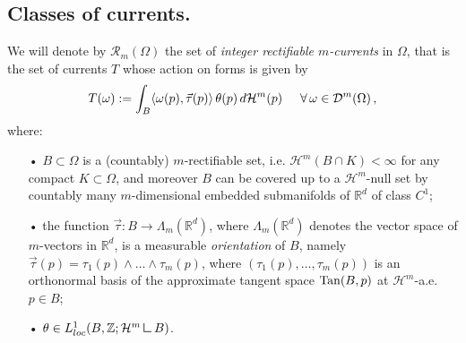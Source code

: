 \documentclass[a4paper,11pt,reqno]{amsart}
\theoremstyle{definition}
\numberwithin{equation}{section}
\numberwithin{subsection}{section}
\newcommand{\Z}{\mathbb{Z}}
\newcommand{\R}{\mathbb{R}}
\newcommand{\mres}{\mathbin{\vrule height 1.6ex depth 0pt width
0.13ex\vrule height 0.13ex depth 0pt width 1.3ex}}
\newcommand{\D}{\mathcal{D}}
\newcommand{\Rc}{\mathscr{R}}
\newcommand{\Ha}{\mathcal{H}}
\begin{document}
\subsection{Classes of currents.} We will denote by $\Rc_m(\Omega)$ the set of \emph{integer rectifiable $m$-currents} in $\Omega$, that is the set of currents $T$ whose action on forms is given by
\begin{equation} \label{corrente rettificabile}
T(\omega) := \int_{B} \langle \omega(p), \vec{\tau}(p) \rangle \, \theta(p) \, d\Ha^{m}(p) \hspace{0.5cm} \forall \, \omega \in \D^{m}(\Omega)\,,
\end{equation}
where:
\begin{itemize}
\item[•] $B \subset \Omega$ is a (countably) $m$-rectifiable set, i.e. $\Ha^m(B \cap K) < \infty$ for any compact $K \subset \Omega$, and moreover $B$ can be covered up to a $\Ha^{m}$-null set by countably many $m$-dimensional embedded submanifolds of $\R^d$ of class $C^1$;
\item[•] the function $\vec{\tau} \colon B \to \Lambda_{m}(\R^d)$, where $\Lambda_{m}(\R^{d})$ denotes the vector space of $m$-vectors in $\R^{d}$, is a measurable \emph{orientation} of $B$, namely $\vec{\tau}(p) = \tau_{1}(p) \wedge \dots \wedge \tau_{m}(p)$, where $\left( \tau_{1}(p), \dots, \tau_{m}(p) \right)$ is an orthonormal basis of the approximate tangent space ${\rm Tan}(B,p)$ at $\Ha^m$-a.e. $p \in B$;
\item[•] $\theta \in L^{1}_{loc}(B,\Z;\Ha^m \mres B)$.
\end{itemize}

%
%
%
%
\end{document}
